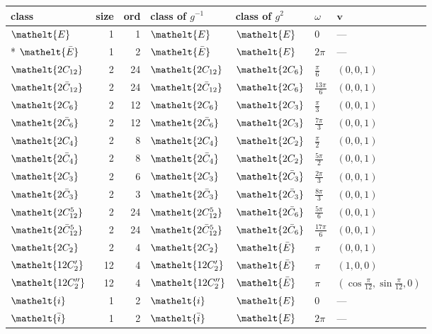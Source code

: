 \documentclass[10pt,a4paper]{article}
\numberwithin{equation}{section}
\newcommand{\eltfont}[1]{{\let\sigma\eltsigma\mathelt{#1}}}
\newcommand{\cls}[1]{\eltfont{#1}}
\newcommand{\dirvec}[3]{(#1, #2, #3)}
\newcommand{\vv}{\mathbf{v}}
\newcommand{\barred}[1]{\bar{#1}}
\begin{document}
{\renewcommand{\arraystretch}{1.3}\begin{longtable}{@{}lrrllll@{}}\toprule
class & size & ord & class of $g^{-1}$ & class of $g^{2}$ & $\omega$ & $\vv$\\\midrule\endhead
\bottomrule\endfoot\endlastfoot
$\cls{E}$ & 1 & 1 & $\cls{E}$ & $\cls{E}$ & $0$ & ---\\*
$\cls{\barred{E}}$ & 1 & 2 & $\cls{\barred{E}}$ & $\cls{E}$ & $2\pi$ & ---\\
$\cls{2C_{12}}$ & 2 & 24 & $\cls{2C_{12}}$ & $\cls{2C_{6}}$ & $\tfrac{\pi}{6}$ & $\dirvec{0}{0}{1}$\\
$\cls{2\barred{C}_{12}}$ & 2 & 24 & $\cls{2\barred{C}_{12}}$ & $\cls{2C_{6}}$ & $\tfrac{13\pi}{6}$ & $\dirvec{0}{0}{1}$\\
$\cls{2C_{6}}$ & 2 & 12 & $\cls{2C_{6}}$ & $\cls{2C_{3}}$ & $\tfrac{\pi}{3}$ & $\dirvec{0}{0}{1}$\\
$\cls{2\barred{C}_{6}}$ & 2 & 12 & $\cls{2\barred{C}_{6}}$ & $\cls{2C_{3}}$ & $\tfrac{7\pi}{3}$ & $\dirvec{0}{0}{1}$\\
$\cls{2C_{4}}$ & 2 & 8 & $\cls{2C_{4}}$ & $\cls{2C_{2}}$ & $\tfrac{\pi}{2}$ & $\dirvec{0}{0}{1}$\\
$\cls{2\barred{C}_{4}}$ & 2 & 8 & $\cls{2\barred{C}_{4}}$ & $\cls{2C_{2}}$ & $\tfrac{5\pi}{2}$ & $\dirvec{0}{0}{1}$\\
$\cls{2C_{3}}$ & 2 & 6 & $\cls{2C_{3}}$ & $\cls{2\barred{C}_{3}}$ & $\tfrac{2\pi}{3}$ & $\dirvec{0}{0}{1}$\\
$\cls{2\barred{C}_{3}}$ & 2 & 3 & $\cls{2\barred{C}_{3}}$ & $\cls{2\barred{C}_{3}}$ & $\tfrac{8\pi}{3}$ & $\dirvec{0}{0}{1}$\\
$\cls{2C_{12}^{5}}$ & 2 & 24 & $\cls{2C_{12}^{5}}$ & $\cls{2\barred{C}_{6}}$ & $\tfrac{5\pi}{6}$ & $\dirvec{0}{0}{1}$\\
$\cls{2\barred{C}_{12}^{5}}$ & 2 & 24 & $\cls{2\barred{C}_{12}^{5}}$ & $\cls{2\barred{C}_{6}}$ & $\tfrac{17\pi}{6}$ & $\dirvec{0}{0}{1}$\\
$\cls{2C_{2}}$ & 2 & 4 & $\cls{2C_{2}}$ & $\cls{\barred{E}}$ & $\pi$ & $\dirvec{0}{0}{1}$\\
$\cls{12C_{2}'}$ & 12 & 4 & $\cls{12C_{2}'}$ & $\cls{\barred{E}}$ & $\pi$ & $\dirvec{1}{0}{0}$\\
$\cls{12C_{2}''}$ & 12 & 4 & $\cls{12C_{2}''}$ & $\cls{\barred{E}}$ & $\pi$ & $\dirvec{\cos\tfrac{\pi}{12}}{\sin\tfrac{\pi}{12}}{0}$\\
$\cls{i}$ & 1 & 2 & $\cls{i}$ & $\cls{E}$ & $0$ & ---\\
$\cls{\barred{i}}$ & 1 & 2 & $\cls{\barred{i}}$ & $\cls{E}$ & $2\pi$ & ---\\

\end{longtable}}
\end{document}
